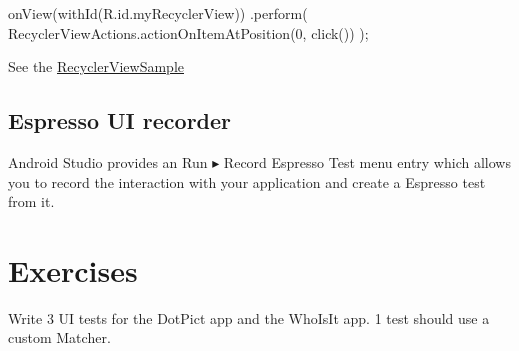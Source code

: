 \begin{android}
onView(withId(R.id.myRecyclerView))
.perform(
RecyclerViewActions.actionOnItemAtPosition(0, click())
);
\end{android}

See the \href{https://github.com/googlesamples/android-testing/tree/master/ui/espresso/RecyclerViewSample}{RecyclerViewSample }

\subsection{Espresso UI recorder}
Android Studio provides an Run ▸ Record Espresso Test menu entry which allows you to record the interaction with your application and create a Espresso test from it.


\newpage
\section{Exercises}
\begin{exercise}
	Write 3 UI tests for the DotPict app and the WhoIsIt app. 1 test should use a custom Matcher.
	
\end{exercise}